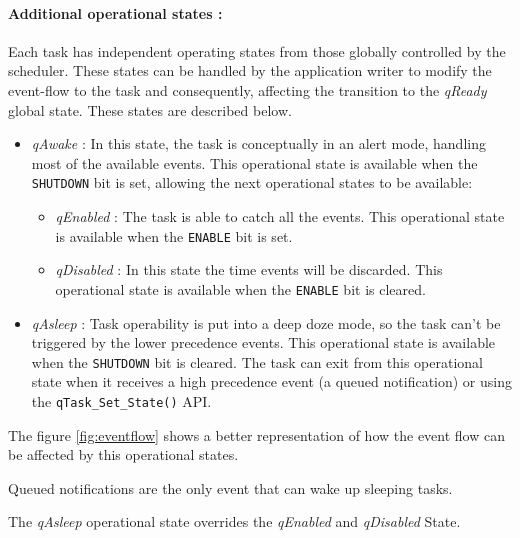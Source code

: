

\paragraph{Additional operational states :}
Each task has independent operating states from those globally controlled by the scheduler. These states can be handled by the application writer to modify the event-flow to the task and consequently, affecting the transition to the \textit{qReady} global state. These states are described below.

\begin{itemize}
    \item \textit{qAwake} : In this state, the task is conceptually in an alert mode, handling most of the available events. This operational state is available when the \lstinline{SHUTDOWN} bit is set, allowing the next operational states to be available:
    \begin{itemize}
        \item \textit{qEnabled} : The task is able to catch all the events. This operational state is available when the \lstinline{ENABLE} bit is set.
        \item \textit{qDisabled} : In this state the time events will be discarded. This operational state is available when the \lstinline{ENABLE} bit is cleared.
    \end{itemize}
    \item \textit{qAsleep} : Task operability is put into a deep doze mode, so the task can't be triggered by the lower precedence events.  This operational state is available when the \lstinline{SHUTDOWN} bit is cleared. The task can exit from this operational state when it receives a high precedence event (a queued notification) or using the \lstinline{qTask_Set_State()} API.
\end{itemize}

The figure \ref{fig:eventflow} shows a better representation of how the event flow can be affected by this operational states.

\begin{tcolorbox}
\HandRight Queued notifications are the only event that can wake up sleeping tasks.
\end{tcolorbox}
\begin{tcolorbox}
\HandRight The \textit{qAsleep} operational state overrides the \textit{qEnabled} and \textit{qDisabled} State.
\end{tcolorbox}

